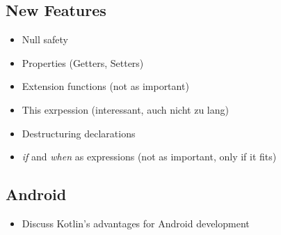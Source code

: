 \documentclass[a4paper, 11pt]{article}
\begin{document}
\subsection{New Features}
\begin{itemize}
  \item Null safety
  \item Properties (Getters, Setters)
  \item Extension functions (not as important)
  \item This exrpession (interessant, auch nicht zu lang)
  \item Destructuring declarations
  \item \textit{if} and \textit{when} as expressions (not as important, only if it fits)
\end{itemize}

\subsection{Android}
\begin{itemize}
  \item Discuss Kotlin's advantages for Android development
\end{itemize}

\newpage
\printbibliography[]
\end{document}
